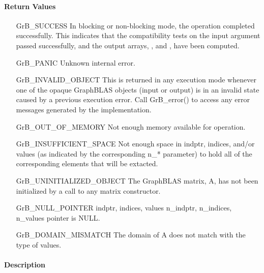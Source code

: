 \paragraph{Return Values}

\begin{itemize}[leftmargin=2.3in]
    \item[{\sf GrB\_SUCCESS}]         In blocking or non-blocking mode, the
    operation completed successfully. This indicates that the compatibility tests on 
    the input argument passed successfully, and the output arrays, , 
     and , have been computed.

    \item[{\sf GrB\_PANIC}]           Unknown internal error.

    \item[{\sf GrB\_INVALID\_OBJECT}] This is returned in any execution mode 
    whenever one of the opaque GraphBLAS objects (input or output) is in an invalid 
    state caused by a previous execution error.  Call {\sf GrB\_error()} to access 
    any error messages generated by the implementation.

    \item[{\sf GrB\_OUT\_OF\_MEMORY}] Not enough memory available for operation.

    \item[{\sf GrB\_INSUFFICIENT\_SPACE}]  Not enough space in {\sf indptr}, 
    {\sf indices}, and/or {\sf values} (as indicated by the corresponding 
    {\sf n\_*} parameter) to hold all of the corresponding elements that will be extacted.
    
    \item[{\sf GrB\_UNINITIALIZED\_OBJECT}]  The GraphBLAS matrix, {\sf A}, has 
    not been initialized by a call to any matrix constructor.

    \item[{\sf GrB\_NULL\_POINTER}]  {\sf indptr}, {\sf indices}, {\sf values} 
    {\sf n\_indptr}, {\sf n\_indices}, {\sf n\_values} pointer is {\sf NULL}.

    \item[{\sf GrB\_DOMAIN\_MISMATCH}]    The domain of {\sf A} does not match
    with the type of {\sf values}.
\end{itemize}

\paragraph{Description}

